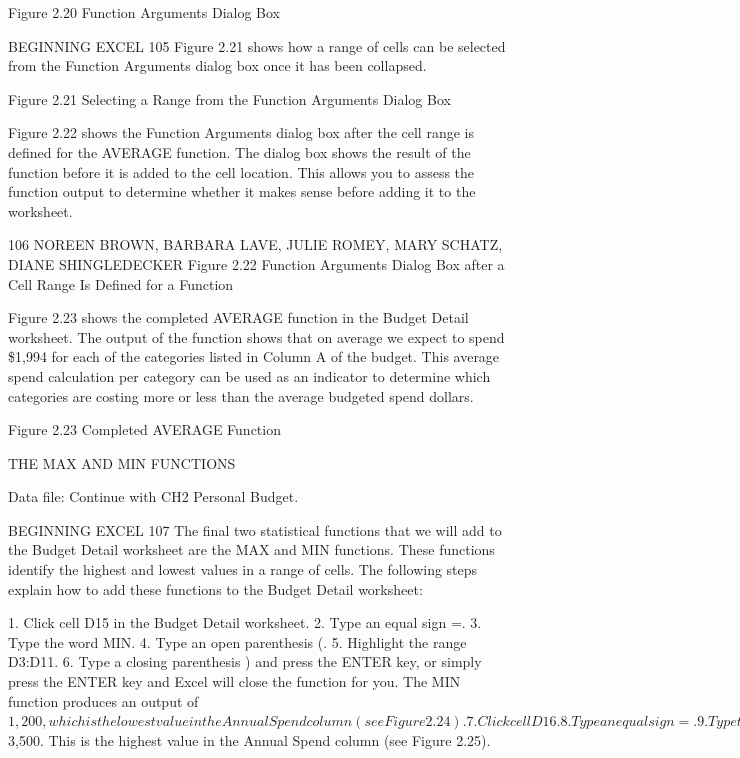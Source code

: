 Figure 2.20 Function Arguments Dialog Box


BEGINNING EXCEL 105
Figure 2.21 shows how a range of cells can be selected from the Function Arguments dialog box once
it has been collapsed.




Figure 2.21 Selecting a Range from the Function Arguments Dialog Box


Figure 2.22 shows the Function Arguments dialog box after the cell range is defined for the
AVERAGE function. The dialog box shows the result of the function before it is added to the cell
location. This allows you to assess the function output to determine whether it makes sense before
adding it to the worksheet.




106 NOREEN BROWN, BARBARA LAVE, JULIE ROMEY, MARY SCHATZ, DIANE SHINGLEDECKER
Figure 2.22 Function Arguments Dialog Box after a Cell Range Is Defined for a Function


Figure 2.23 shows the completed AVERAGE function in the Budget Detail worksheet. The output
of the function shows that on average we expect to spend \$1,994 for each of the categories listed in
Column A of the budget. This average spend calculation per category can be used as an indicator to
determine which categories are costing more or less than the average budgeted spend dollars.




Figure 2.23 Completed AVERAGE Function


THE MAX AND MIN FUNCTIONS

Data file: Continue with CH2 Personal Budget.

BEGINNING EXCEL 107
The final two statistical functions that we will add to the Budget Detail worksheet are the MAX
and MIN functions. These functions identify the highest and lowest values in a range of cells. The
following steps explain how to add these functions to the Budget Detail worksheet:

1.   Click cell D15 in the Budget Detail worksheet.
2.   Type an equal sign =.
3.   Type the word MIN.
4.   Type an open parenthesis (.
5.   Highlight the range D3:D11.
6.   Type a closing parenthesis ) and press the ENTER key, or simply press the ENTER key and
Excel will close the function for you. The MIN function produces an output of $1,200, which is
the lowest value in the Annual Spend column (see Figure 2.24).
7.   Click cell D16.
8.   Type an equal sign =.
9.   Type the word MAX.
10.   Type an open parenthesis (.
11.   Highlight the range D3:D11.
12.   Type a closing parenthesis ) and press the ENTER key, or simply press the ENTER key and
Excel will close the function for you. The MAX function produces an output of $3,500. This is
the highest value in the Annual Spend column (see Figure 2.25).




